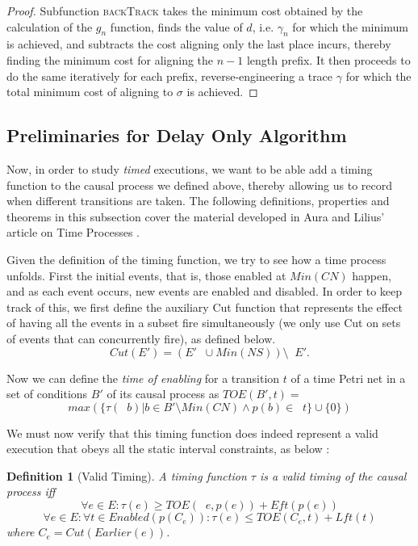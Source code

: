 \documentclass[conference]{IEEEtran}
\DeclareMathOperator*{\pre}{^\bullet}
\newtheorem{definition}{Definition}
\begin{document}
\begin{proof}
		Subfunction \textsc{backTrack} takes the minimum cost obtained by the calculation of the $g_n$ function, finds the value of $d$, i.e. $\gamma_n$ for which the minimum is achieved, and subtracts the cost aligning only the last place incurs, thereby finding the minimum cost for aligning the $n-1$ length prefix. 
		It then proceeds to do the same iteratively for each prefix, reverse-engineering a trace $\gamma$ for which the total minimum cost of aligning to $\sigma$ is achieved. 
		
	\end{proof}
	
	\subsection{Preliminaries for Delay Only Algorithm} 
	
	
	Now, in order to study \textit{timed} executions, we want to be able add a timing function to the causal process we defined above, thereby allowing us to record when different transitions are taken. 
	The following definitions, properties and theorems in this subsection cover the material developed in Aura and Lilius' article on Time Processes \cite{AL97}. 
	
	Given the definition of the timing function, we try to see how a time process unfolds. 
	First the initial events, that is, those enabled at $Min(CN)$ happen, and as each event occurs, new events are enabled and disabled. 
	In order to keep track of this, we first define the auxiliary Cut function that represents the effect of having all the events in a subset fire simultaneously (we only use Cut on sets of events that can concurrently fire), as defined below. 
	$$Cut(E') = (E' \pre  \cup Min(NS)) \setminus \pre  E'.$$
	
	Now we can define the  \textit{time of enabling} for a transition $t$ of a time Petri net in a set of conditions $B'$ of its causal process as $TOE(B', t) = $ $$ max(\{\tau(\pre b) | b \in B' \setminus Min(CN) \wedge p(b) \in \pre  t\} \cup \{0\})$$
	
	We must now verify that this timing function does indeed represent a valid execution that obeys all the static interval constraints, as below : 
	
	\begin{definition}[Valid Timing] \label{validt} A timing function $\tau$ is a \textit{valid timing} of the causal process iff 
		$$\forall e \in E : \tau(e) \geq TOE(\pre e, p(e) ) + Eft(p(e))$$
		$$\forall e \in E : \forall t \in Enabled (p(C_e)) : \tau(e) \leq TOE(C_e, t) + Lft(t)$$ 
		where $C_e = Cut(Earlier(e))$. 
	\end{definition}
	
\end{document}
